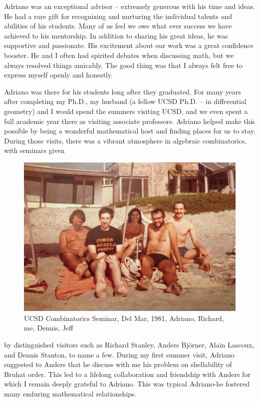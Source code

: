 \documentclass{notices}
\begin{document}
Adriano was an exceptional advisor -- extremely generous with his time and ideas. He had a rare gift for recognizing and nurturing the individual talents and abilities of his students.   Many of us feel we owe what ever success we have achieved to his mentorship.  In addition to sharing his great ideas, he was supportive and passionate.  His excitement about our work was a great confidence booster.  He and I often had spirited debates when discussing math,  but we always resolved things amicably.   The good thing was that I always felt free to express myself openly and honestly. 

Adriano was there for his students long after they graduated.    For many years after completing my Ph.D., my husband (a fellow UCSD Ph.D. -- in differential geometry)  and I would spend the summers visiting UCSD, and we even spent a full academic year there as visiting associate professors.   
Adriano helped make this possible by being a wonderful mathematical host and finding  places for us to stay.   
During those visits, there was a vibrant atmosphere in algebraic combinatorics, with seminars given
\begin{figure}
 \centering
    \includegraphics[width=0.95\linewidth]{Michelle_Wachs/IMG_2458.jpg} 
  {\footnotesize UCSD Combinatorics Seminar, Del Mar, 1981, Adriano, Richard, me, Dennis, Jeff}
\end{figure}
by distinguished visitors such as Richard Stanley, Anders Bj\"orner, Alain Lascoux, and Dennis Stanton, to name a few. 
 During my first summer visit, Adriano suggested to Anders that he discuss with me his problem  on shellability of Bruhat order.   This led to a lifelong collaboration and friendship with Anders for which I remain deeply grateful to Adriano. This was typical Adriano-he fostered many enduring mathematical relationships.
\end{document}
